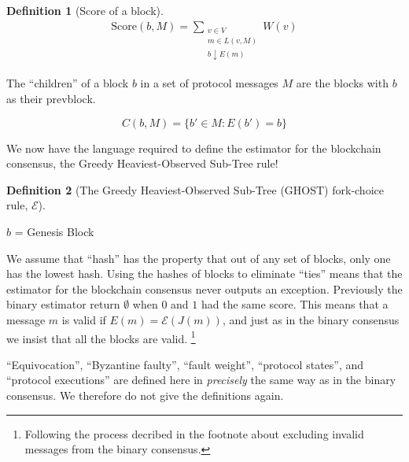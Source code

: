 \documentclass{article}
\theoremstyle{definition}
\newtheorem{defn}{Definition}[section]
\begin{document}
\begin{defn}[Score of a block]
\begin{align}
\text{Score}(b, M) = \sum_{\substack{v \in V \\ m \in L(v,M) \\ b \downarrow E(m)}} W(v)
\end{align}
\end{defn}

The ``children'' of a block $b$ in a set of protocol messages $M$ are the blocks with $b$ as their prevblock.

$$
C(b,M) = \{b' \in M : E(b') = b\}
$$

We now have the language required to define the estimator for the blockchain consensus, the Greedy Heaviest-Observed Sub-Tree rule!
\begin{defn}[The Greedy Heaviest-Observed Sub-Tree (GHOST) fork-choice rule, $\mathcal{E}$]
\end{defn}

\begin{algorithm}[H]
 $b$ = Genesis Block


\caption{The Greedy Heaviest-Observed Sub-tree Fork-choice rule, $\mathcal{E}$}
\end{algorithm}

We assume that ``hash'' has the property that out of any set of blocks, only one has the lowest hash. Using the hashes of blocks to eliminate ``ties'' means that the estimator for the blockchain consensus never outputs an exception. Previously the binary estimator return $\emptyset$ when $0$ and $1$ had the same score. This means that a message $m$ is valid if $E(m) = \mathcal{E}(J(m))$, and just as in the binary consensus we insist that all the blocks are valid. \footnote{Following the process decribed in the footnote about excluding invalid messages from the binary consensus.}

``Equivocation'', ``Byzantine faulty'', ``fault weight'', ``protocol states'', and ``protocol executions'' are defined here in \emph{precisely} the same way as in the binary consensus. We therefore do not give the definitions again.
\end{document}
